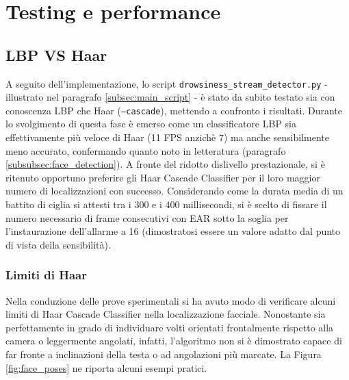 \documentclass[12pt]{article}
\begin{document}
\newpage



\section{Testing e performance}
\label{sec:testing}

\subsection{LBP VS Haar}
A seguito dell'implementazione, lo script \texttt{drowsiness\_stream\_detector.py} - illustrato nel paragrafo \ref{subsec:main_script} -  è stato da subito testato sia con conoscenza LBP che Haar (\texttt{--cascade}), mettendo a confronto i risultati. Durante lo svolgimento di questa fase è emerso come un classificatore LBP sia effettivamente più veloce di Haar (11 FPS anzichè 7) ma anche sensibilmente meno accurato, confermando quanto noto in letteratura (paragrafo \ref{subsubsec:face_detection}). A fronte del ridotto dislivello prestazionale, si è ritenuto opportuno preferire gli Haar Cascade Classifier per il loro maggior numero di localizzazioni con successo. Considerando come la durata media di un battito di ciglia si attesti tra i 300 e i 400 millisecondi, si è scelto di fissare il numero necessario di frame consecutivi con EAR sotto la soglia per l'instaurazione dell'allarme a 16 (dimostratosi essere un valore adatto dal punto di vista della sensibilità).

\subsubsection{Limiti di Haar}
Nella conduzione delle prove sperimentali si ha avuto modo di verificare alcuni limiti di Haar Cascade Classifier nella localizzazione facciale. Nonostante sia perfettamente in grado di individuare volti orientati frontalmente rispetto alla camera o leggermente angolati, infatti, l'algoritmo non si è dimostrato capace di far fronte a inclinazioni della testa o ad angolazioni più marcate. La Figura \ref{fig:face_poses} ne riporta alcuni esempi pratici.
\end{document}
